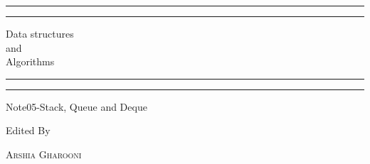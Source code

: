 \documentclass[a4paper, 11pt, oneside]{book} %
\begin{document}
 

\begin{titlepage} %

	\centering %
	
	\scshape %
	
	\vspace*{\baselineskip} %
	
	
	\rule{\textwidth}{1.6pt}\vspace*{-\baselineskip}\vspace*{2pt} %
	\rule{\textwidth}{0.4pt} %
	
	\vspace{0.75\baselineskip} %
	
	{\LARGE Data structures\\ and\\ Algorithms\\} %
	
	\vspace{0.75\baselineskip} %
	
	\rule{\textwidth}{0.4pt}\vspace*{-\baselineskip}\vspace{3.2pt} %
	\rule{\textwidth}{1.6pt} %
	
	\vspace{2\baselineskip} %
	
	
	Note05-Stack, Queue and Deque %
	
	\vspace*{3\baselineskip} %
	
	
	Edited By
	
	\vspace{0.5\baselineskip} %
	
	{\scshape\Large Arshia Gharooni \\} %
	

\end{titlepage}
\end{document}
